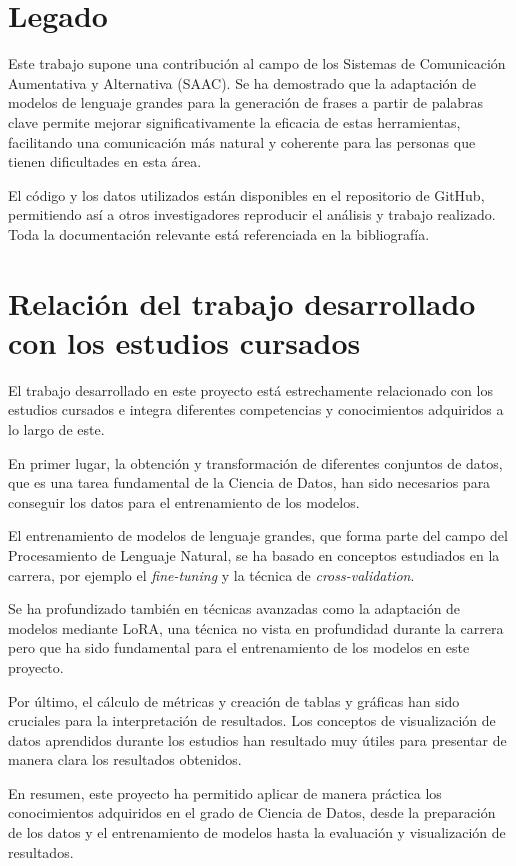 \documentclass[11pt,spanish,listoffigures,listoftables]{tfgetsinf}
\begin{document}
\section{Legado}

Este trabajo supone una contribución al campo de los Sistemas de Comunicación Aumentativa y Alternativa (SAAC). Se ha demostrado que la adaptación de modelos de lenguaje grandes para la generación de frases a partir de palabras clave permite mejorar significativamente la eficacia de estas herramientas, facilitando una comunicación más natural y coherente para las personas que tienen dificultades en esta área.

El código y los datos utilizados están disponibles en el repositorio de GitHub, permitiendo así a otros investigadores reproducir el análisis y trabajo realizado. Toda la documentación relevante está referenciada en la bibliografía.

\section{Relación del trabajo desarrollado con los estudios cursados}

El trabajo desarrollado en este proyecto está estrechamente relacionado con los estudios cursados e integra diferentes competencias y conocimientos adquiridos a lo largo de este. 

En primer lugar, la obtención y transformación de diferentes conjuntos de datos, que es una tarea fundamental de la Ciencia de Datos, han sido necesarios para conseguir los datos para el entrenamiento de los modelos.

El entrenamiento de  modelos de lenguaje grandes, que forma parte del campo del Procesamiento de Lenguaje Natural, se ha basado en conceptos estudiados en la carrera, por ejemplo el \textit{fine-tuning} y la técnica de \textit{cross-validation}.

Se ha profundizado también en técnicas avanzadas como la adaptación de modelos mediante LoRA, una técnica no vista en profundidad durante la carrera pero que ha sido fundamental para el entrenamiento de los modelos en este proyecto.

Por último, el cálculo de métricas y creación de tablas y gráficas han sido cruciales para la interpretación de resultados. Los conceptos de visualización de datos  aprendidos durante los estudios han resultado muy útiles para presentar de manera clara los resultados obtenidos.

En resumen, este proyecto ha permitido aplicar de manera práctica los conocimientos adquiridos en el grado de Ciencia de Datos, desde la preparación de los datos y el entrenamiento de modelos hasta la evaluación y visualización de resultados.
\end{document}
